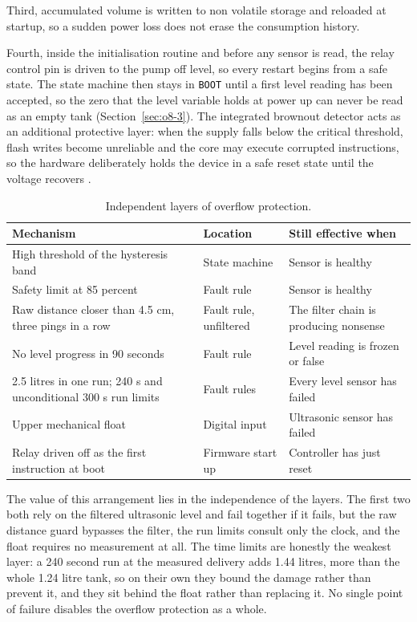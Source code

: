 Third, accumulated volume is written to non volatile storage and reloaded at startup, so a sudden power loss does not erase the consumption history.

Fourth, inside the initialisation routine and before any sensor is read, the relay control pin is driven to the pump off level, so every restart begins from a safe state. The state machine then stays in \texttt{BOOT} until a first level reading has been accepted, so the zero that the level variable holds at power up can never be read as an empty tank (Section~\ref{sec:o8-3}). The integrated brownout detector acts as an additional protective layer: when the supply falls below the critical threshold, flash writes become unreliable and the core may execute corrupted instructions, so the hardware deliberately holds the device in a safe reset state until the voltage recovers \cite{slide01}.

\begin{table}[H]
\caption{Independent layers of overflow protection.}
\label{tab:layers}
\centering
\renewcommand{\arraystretch}{1.1}
\begin{tabular}{|p{4.6cm}|p{3.6cm}|p{4.8cm}|}
\hline
\textbf{Mechanism} & \textbf{Location} & \textbf{Still effective when} \\
\hline
High threshold of the hysteresis band & State machine & Sensor is healthy \\
\hline
Safety limit at 85 percent & Fault rule & Sensor is healthy \\
\hline
Raw distance closer than 4.5 cm, three pings in a row & Fault rule, unfiltered & The filter chain is producing nonsense \\
\hline
No level progress in 90 seconds & Fault rule & Level reading is frozen or false \\
\hline
2.5 litres in one run; 240 s and unconditional 300 s run limits & Fault rules & Every level sensor has failed \\
\hline
Upper mechanical float & Digital input & Ultrasonic sensor has failed \\
\hline
Relay driven off as the first instruction at boot & Firmware start up & Controller has just reset \\
\hline
\end{tabular}
\end{table}

The value of this arrangement lies in the independence of the layers. The first two both rely on the filtered ultrasonic level and fail together if it fails, but the raw distance guard bypasses the filter, the run limits consult only the clock, and the float requires no measurement at all. The time limits are honestly the weakest layer: a 240 second run at the measured delivery adds 1.44 litres, more than the whole 1.24 litre tank, so on their own they bound the damage rather than prevent it, and they sit behind the float rather than replacing it. No single point of failure disables the overflow protection as a whole.
